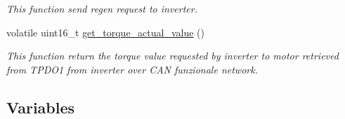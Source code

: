 \begin{DoxyCompactItemize}
\begin{DoxyCompactList}\small\item\em This function send regen request to inverter. \end{DoxyCompactList}\item 
volatile uint16\-\_\-t \hyperlink{group___c_a_n__funzionale__group_ga3c4828f57a818b8e1b2f277c2174b5da}{get\-\_\-torque\-\_\-actual\-\_\-value} ()
\begin{DoxyCompactList}\small\item\em This function return the torque value requested by inverter to motor retrieved from T\-P\-D\-O1 from inverter over C\-A\-N funzionale network. \end{DoxyCompactList}\end{DoxyCompactItemize}
\subsection*{Variables}
